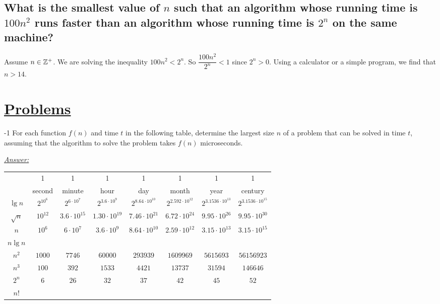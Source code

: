\subsection
{What is the smallest value of $n$ such that an algorithm whose running time is $100n^2$
runs faster than an algorithm whose running time is $2^n$ on the same machine?}
Assume $n \in \mathbb{Z}^+$. We are solving the inequality $100n^2 < 2^n$. So $\dfrac{100n^2}{2^n} < 1$ since $2^n > 0$. 
Using a calculator or a simple program, we find that $\boxed{n > 14.}$
\solid
\section*{\underline{Problems}}
-1 \quad For each function $f(n)$ and time $t$ in the following table, determine the largest
size $n$ of a problem that can be solved in time $t$, assuming that the algorithm to
solve the problem takes $f(n)$ microseconds.

\medskip

\underline{\textit{Answer:}}

\medskip

\begin{center}
    \begin{tabular}{c | c | c | c | c | c | c | c |}
        & 1 & 1 & 1 & 1 & 1 & 1 & 1 \\
        & second & minute & hour & day & month & year & century \\\hline \rule{0pt}{2.8ex}
        $\lg{n}$ & $2^{10^6}$ & $2^{6 \cdot 10^7}$ & $2^{3.6 \cdot 10^9}$ & $2^{8.64 \cdot 10^{10}}$ & $2^{2.592 \cdot 10^{12}}$ & $2^{3.1536 \cdot 10^{13}}$ & $2^{3.1536 \cdot 10^{15}}$  \\\hline \rule{0pt}{2.5ex}
        $\sqrt{n}$ & $10^{12}$ & $3.6 \cdot 10^{15}$ & $1.30 \cdot 10^{19}$ & $7.46 \cdot 10^{21}$ & $6.72 \cdot 10^{24}$ & $9.95 \cdot 10^{26}$ & $9.95 \cdot 10^{30}$ \\\hline \rule{0pt}{2.5ex}
        $n$ & $10^6$ & $6 \cdot 10^7$ & $3.6 \cdot 10^9$ & $8.64 \cdot 10^{10}$ & $2.59 \cdot 10^{12}$ & $3.15 \cdot 10^{13}$ & $3.15 \cdot 10^{15}$ \\\hline \rule{0pt}{2.5ex}
        $n\lg{n}$ & & & & & & & \\\hline \rule{0pt}{2.5ex}
        $n^2$ & $1000$ & $7746$ & $60000$ & $293939$ & $1609969$ & $5615693$ & $56156923$ \\\hline \rule{0pt}{2.5ex}
        $n^3$ & $100$ & $392$ & $1533$ & $4421$ & $13737$ & $31594$ & $146646$ \\\hline \rule{0pt}{2.5ex}
        $2^n$ & $6$ & $26$ & $32$ & $37$ & $42$ & $45$ & $52$ \\\hline \rule{0pt}{2.5ex}
        $n!$ &  &  &  &  &  &  &  \\\hline 
    \end{tabular}
\end{center}

